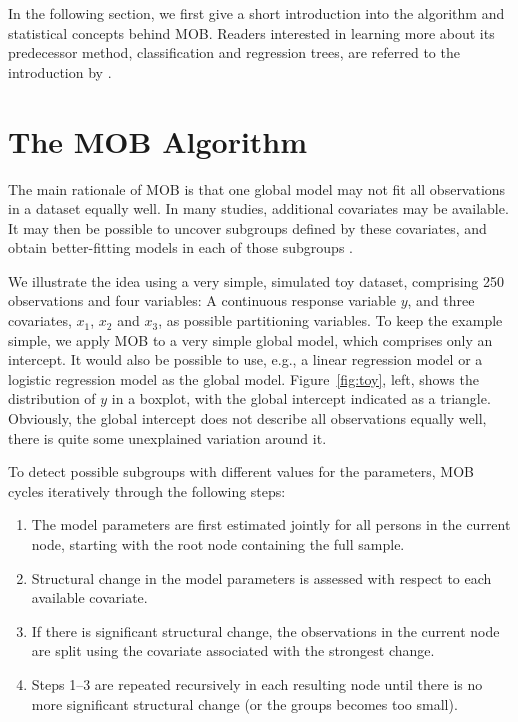 \documentclass[doc,floatsintext,natbib]{apa7}
\begin{document}
In the following section, we first give a short introduction into the algorithm and statistical concepts behind MOB. Readers interested in learning more about its predecessor method, classification and regression trees, are referred to the introduction by \citet{StrMalTut:2009:PM}. 

\section{The MOB Algorithm}

The main rationale of MOB is that one global model may not fit all observations in a dataset equally well. In many studies, additional covariates may be available. It may then be possible to uncover subgroups defined by these covariates, and obtain better-fitting models in each of those subgroups \citep{ZeilyHoth08}. 


We illustrate the idea using a very simple, simulated toy dataset, comprising 250 observations and four variables: A continuous response variable $y$, and three covariates, $x_1$, $x_2$ and $x_3$, as possible partitioning variables. 
To keep the example simple, we apply MOB to a very simple global model, which comprises only an intercept. It would also be possible to use, e.g., a linear regression model or a logistic regression model as the global model. Figure~\ref{fig:toy}, left, shows the distribution of $y$ in a boxplot, with the global intercept indicated as a triangle. Obviously, the global intercept does not describe all observations equally well, there is quite some unexplained variation around it.

To detect possible subgroups with different values for the parameters, MOB cycles iteratively through the following steps:

\begin{enumerate}
\setlength\itemsep{0.25em}
\item The model parameters are first estimated jointly for all persons in the current node, starting with the root node containing the full sample.
\item Structural change in the model parameters is assessed with respect to each available covariate.
\item If there is significant structural change, the observations in the current node are split using the covariate associated with the strongest change.
\item Steps 1--3 are repeated recursively in each resulting node until there is no more significant structural change (or the groups becomes too small).
\end{enumerate}
\end{document}

